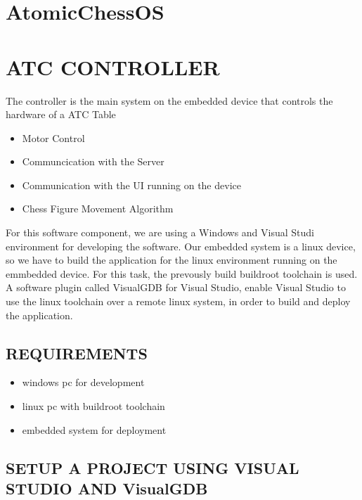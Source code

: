 \hypertarget{atomicchessos}{%
\section{AtomicChessOS}\label{atomicchessos}}

\hypertarget{atc-controller}{%
\section{ATC CONTROLLER}\label{atc-controller}}

The controller is the main system on the embedded device that controls
the hardware of a ATC Table

\begin{itemize}
\tightlist
\item
  Motor Control
\item
  Communcication with the Server
\item
  Communication with the UI running on the device
\item
  Chess Figure Movement Algorithm
\end{itemize}

For this software component, we are using a Windows and Visual Studi
environment for developing the software. Our embedded system is a linux
device, so we have to build the application for the linux environment
running on the emmbedded device. For this task, the prevously build
buildroot toolchain is used. A software plugin called VisualGDB for
Visual Studio, enable Visual Studio to use the linux toolchain over a
remote linux system, in order to build and deploy the application.

\hypertarget{requirements}{%
\subsection{REQUIREMENTS}\label{requirements}}

\begin{itemize}
\tightlist
\item
  windows pc for development
\item
  linux pc with buildroot toolchain
\item
  embedded system for deployment
\end{itemize}

\hypertarget{setup-a-project-using-visual-studio-and-visualgdb}{%
\subsection{SETUP A PROJECT USING VISUAL STUDIO AND
VisualGDB}\label{setup-a-project-using-visual-studio-and-visualgdb}}

